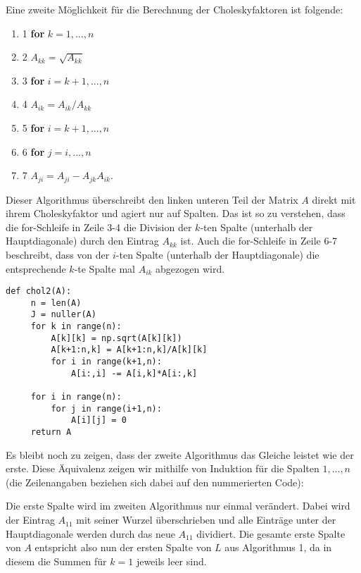 Eine zweite Möglichkeit für die Berechnung der Choleskyfaktoren ist folgende:

\begin{enumerate}
\itemsep0em
\item[] 1 \textbf{for} $k = 1,...,n$
\item[] 2 \qquad $A_{kk} = \sqrt{A_{kk}}$
\item[] 3 \qquad \textbf{for} $i = k+1,...,n$
\item[] 4 \qquad \qquad $A_{ik} = A_{ik}/A_{kk}$
\item[] 5 \qquad \textbf{for} $i = k+1,...,n$
\item[] 6 \qquad \qquad \textbf{for} $j = i,...,n$
\item[] 7 \qquad \qquad \qquad $A_{ji} = A_{ji} - A_{jk} A_{ik}$.

\end{enumerate}

Dieser Algorithmus überschreibt den linken unteren Teil der Matrix $A$ direkt mit ihrem Choleskyfaktor und agiert nur auf Spalten. Das ist so zu verstehen, dass die for-Schleife in Zeile 3-4 die Division der $k$-ten Spalte (unterhalb der Hauptdiagonale) durch den Eintrag $A_{kk}$ ist. Auch die for-Schleife in Zeile 6-7 beschreibt, dass von der $i$-ten Spalte (unterhalb der Hauptdiagonale) die entsprechende $k$-te Spalte mal $A_{ik}$ abgezogen wird.


\lstset{language=Python}
\lstset{frame=lines}
\lstset{basicstyle=\footnotesize}
\begin{lstlisting}
def chol2(A):
     n = len(A)
     J = nuller(A)
     for k in range(n):
         A[k][k] = np.sqrt(A[k][k])
         A[k+1:n,k] = A[k+1:n,k]/A[k][k]
         for i in range(k+1,n):
             A[i:,i] -= A[i,k]*A[i:,k]

     for i in range(n):
         for j in range(i+1,n):
             A[i][j] = 0
     return A
\end{lstlisting}

Es bleibt noch zu zeigen, dass der zweite Algorithmus das Gleiche leistet wie der erste. Diese Äquivalenz zeigen wir mithilfe von Induktion für die Spalten $1,...,n$ (die Zeilenangaben beziehen sich dabei auf den nummerierten Code):

Die erste Spalte wird im zweiten Algorithmus nur einmal verändert. Dabei wird der Eintrag $A_{11}$ mit seiner Wurzel überschrieben und alle Einträge unter der Hauptdiagonale werden durch das neue $A_{11}$ dividiert. Die gesamte erste Spalte von $A$ entspricht also nun der ersten Spalte von $L$ aus Algorithmus 1, da in diesem die Summen für $k=1$ jeweils leer sind.

